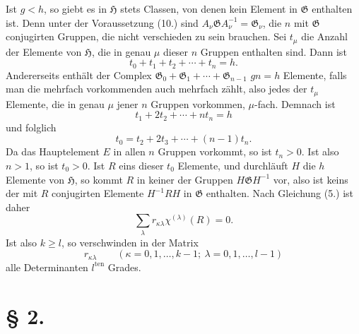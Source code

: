 \documentclass[11pt]{article}
\newcommand{\Hgr}{\mathfrak{H}}
\newcommand{\Ggr}{\mathfrak{G}}
\begin{document}
Ist $g<h$, so giebt es in $\Hgr$ stets Classen, von denen kein Element in $\Ggr$ enthalten ist. Denn unter der Voraussetzung (10.) sind $A_\nu\Ggr A_\nu^{-1}=\Ggr_\nu$, die $n$ mit $\Ggr$ conjugirten Gruppen, die nicht verschieden zu sein brauchen. Sei $t_\mu$ die Anzahl der Elemente von $\Hgr$, die in genau $\mu$ dieser $n$ Gruppen enthalten sind. Dann ist
\[
  t_0+t_1+t_2+\cdots+t_n=h.
\]
Andererseits enthält der Complex $\Ggr_0+\Ggr_1+\cdots+\Ggr_{n-1}$ $gn=h$ Elemente, falls man die mehrfach vorkommenden auch mehrfach zählt, also jedes der $t_\mu$ Elemente, die in genau $\mu$ jener $n$ Gruppen vorkommen, $\mu$-fach. Demnach ist
\[
  t_1+2t_2+\cdots+nt_n=h
\]
und folglich
\[
  t_0=t_2+2t_3+\cdots+(n-1)t_n.
\]
Da das Hauptelement $E$ in allen $n$ Gruppen vorkommt, so ist $t_n>0$. Ist also $n>1$, so ist $t_0>0$. Ist $R$ eins dieser $t_0$ Elemente, und durchläuft $H$ die $h$ Elemente von $\Hgr$, so kommt $R$ in keiner der Gruppen $H\Ggr H^{-1}$ vor, also ist keins der mit $R$ conjugirten Elemente $H^{-1}RH$ in $\Ggr$ enthalten. Nach Gleichung (5.) ist daher
\[
  \sum_\lambda r_{\kappa\lambda}\chi^{(\lambda)}(R)=0.
\]
Ist also $k\ge l$, so verschwinden in der Matrix
\[
\tag{18.}
  r_{\kappa\lambda}\qquad(\kappa=0,1,\ldots,k-1;\ \lambda=0,1,\ldots,l-1)
\]
alle Determinanten $l^{\mathrm{ten}}$ Grades.

\section*{§ 2.}
\end{document}
